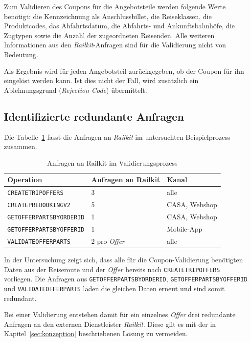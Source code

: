 Zum Validieren des Coupons für die Angebotsteile werden folgende Werte benötigt: die Kennzeichnung als Anschlussbillet, die Reiseklassen, die Produktcodes, das Abfahrtsdatum, die Abfahrts- und Ankunftsbahnhöfe, die Zugtypen sowie die Anzahl der zugeordneten Reisenden. Alle weiteren Informationen aus den \textit{Railkit}-Anfragen sind für die Validierung nicht von Bedeutung.

Als Ergebnis wird für jeden Angebotsteil zurückgegeben, ob der Coupon für ihn eingelöst werden kann. Ist dies nicht der Fall, wird zusätzlich ein Ablehnungsgrund (\textit{Rejection Code}) übermittelt.

\subsection{Identifizierte redundante Anfragen}
\label{subsec:redundanzen}

Die Tabelle~\ref{tab:railkit_anfragen} fasst die Anfragen an \textit{Railkit} im untersuchten Beispielprozess zusammen.

\begin{table}[htbp]
    \centering
    \begin{tabular}{p{} p{} p{}}
        \hline
        \textbf{Operation} & \textbf{Anfragen an Railkit} & \textbf{Kanal} \\
        \hline
        \texttt{CREATETRIPOFFERS} & 3 & alle \\
        \texttt{CREATEPREBOOKINGV2} & 5 & CASA, Webshop \\
        \texttt{GETOFFERPARTSBYORDERID} & 1 & CASA, Webshop \\
        \texttt{GETOFFERPARTSBYOFFERID} & 1 & Mobile-App \\
        \texttt{VALIDATEOFFERPARTS} & 2 pro \textit{Offer} & alle \\
        \hline
    \end{tabular}
    \caption{Anfragen an Railkit im Validierungsprozess}
    \label{tab:railkit_anfragen}
\end{table}

In der Untersuchung zeigt sich, dass alle für die Coupon-Validierung benötigten Daten aus der Reiseroute und der \textit{Offer} bereits nach \texttt{CREATETRIPOFFERS} vorliegen. Die Anfragen aus \texttt{GETOFFERPARTSBYORDERID}, \texttt{GETOFFERPARTSBYOFFERID} und \texttt{VALIDATEOFFERPARTS} laden die gleichen Daten erneut und sind somit redundant.

Bei einer Validierung entstehen damit für ein einzelnes \textit{Offer} drei redundante Anfragen an den externen Dienstleister \textit{Railkit}. Diese gilt es mit der in Kapitel~\ref{sec:konzeption} beschriebenen Lösung zu vermeiden.